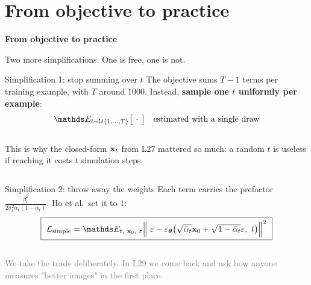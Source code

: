 \documentclass[aspectratio=169]{beamer}
\begin{document}
\section{From objective to practice}

\begin{frame}[plain]
  \vfill
  \begin{center}
    {\Large\color{popblue}\textbf{From objective to practice}}\\[0.9em]
    \begin{minipage}{0.82\textwidth}\centering\small
      Two more simplifications. One is free, one is not.
    \end{minipage}
  \end{center}
  \vfill
\end{frame}

\begin{frame}{Simplification 1: stop summing over $t$}
  \small
  The objective sums $T-1$ terms per training example, with $T$ around $1000$. Instead,
  \textbf{sample one $t$ uniformly per example}:
  \[
    \E_{t\sim \mathcal{U}\{1,\dots,T\}}\big[\,\cdot\,\big]
    \quad\text{estimated with a single draw}
  \]
  \begin{columns}[T]
    \footnotesize
    This is why the closed-form $\mathbf{x}_t$ from L27 mattered so much: a random $t$ is
    useless if reaching it costs $t$ simulation steps.
  \end{columns}
\end{frame}

\begin{frame}{Simplification 2: throw away the weights}
  \small
  Each term carries the prefactor
  $\tfrac{\beta_t^2}{2\sigma_t^2\alpha_t(1-\bar\alpha_t)}$. Ho et al.\ set it to $1$:
  \[
    \boxed{\ \mathcal{L}_{\text{simple}}
      = \E_{t,\ \xv_0,\ \eps}
      \Big\|\ \eps - \eps_{\thetav}\big(\sqrt{\bar\alpha_t}\xv_0 + \sqrt{1-\bar\alpha_t}\eps,\ t\big)\Big\|^{2}\ }
  \]
  \vskip 4pt
  \begin{columns}[T]
  \end{columns}
  \vskip 5pt
  \footnotesize
  \textcolor{gray}{We take the trade deliberately. In L29 we come back and ask how anyone
  measures "better images" in the first place.}
\end{frame}
\end{document}
